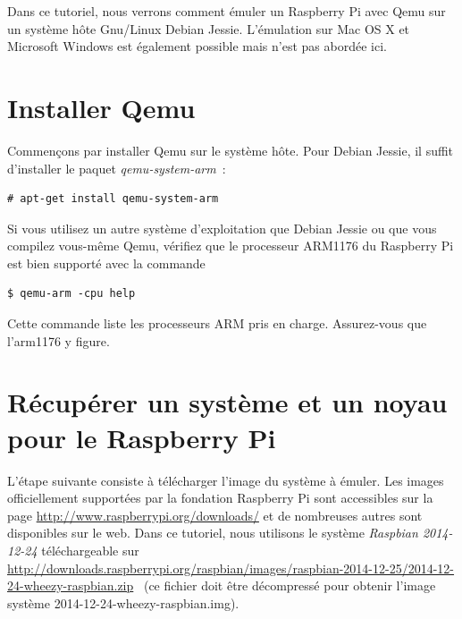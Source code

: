 \documentclass{article}
\begin{document}
Dans ce tutoriel, nous verrons comment émuler un Raspberry Pi avec Qemu sur un
système hôte Gnu/Linux Debian Jessie.
L'émulation sur Mac OS X et Microsoft Windows est également possible mais n'est
pas abordée ici.



\section{Installer Qemu}\label{sec:intall-qemu}

Commençons par installer Qemu sur le système hôte.  Pour Debian Jessie, il
suffit d'installer le paquet {\em qemu-system-arm}~:
\begin{verbatim}
# apt-get install qemu-system-arm
\end{verbatim}


Si vous utilisez un autre système d'exploitation que Debian Jessie ou que vous
compilez vous-même Qemu, vérifiez que le processeur ARM1176 du Raspberry Pi est
bien supporté avec la commande
\begin{verbatim}
$ qemu-arm -cpu help
\end{verbatim}
Cette commande liste les processeurs ARM pris en charge.
Assurez-vous que l'arm1176 y figure.



\section{Récupérer un système et un noyau pour le Raspberry Pi}\label{sec:get-distro-and-kernel}

L'étape suivante consiste à télécharger l'image du système à émuler.
Les images officiellement supportées par la fondation Raspberry Pi
sont accessibles sur la page
\url{http://www.raspberrypi.org/downloads/}
et de nombreuses autres sont disponibles sur le web.
%
Dans ce tutoriel, nous utilisons le système {\em Raspbian 2014-12-24} téléchargeable sur
\url{http://downloads.raspberrypi.org/raspbian/images/raspbian-2014-12-25/2014-12-24-wheezy-raspbian.zip}~%
(ce fichier doit être décompressé pour obtenir l'image système \og{}2014-12-24-wheezy-raspbian.img\fg{}).
\end{document}
